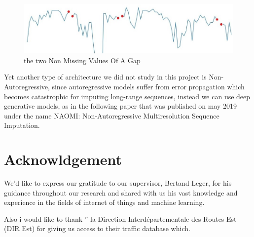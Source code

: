 \begin{figure}[h]
\centering
\includegraphics[scale=0.5]{img/extrapoalting.jpg}
\caption{the two Non Missing Values Of A Gap}
\label{fig:extrapo}
\end{figure}

Yet another type of architecture we did not study in this project is Non-Autoregressive, since  autoregressive models  suffer from error propagation which becomes catastrophic for imputing long-range sequences, instead we can use  deep generative models, as in the following paper that was published on may 2019 under the name NAOMI: Non-Autoregressive Multiresolution Sequence Imputation\cite{naomi}.




\section{Acknowldgement}

We'd like to express our gratitude to our supervisor, Bertand Leger, for his guidance  throughout our research and shared with us his vast knowledge and
experience in the fields of internet of things and machine learning.

Also i would like to thank   '' la Direction Interdépartementale des Routes Est (DIR Est) for giving us access to their traffic database which. 


